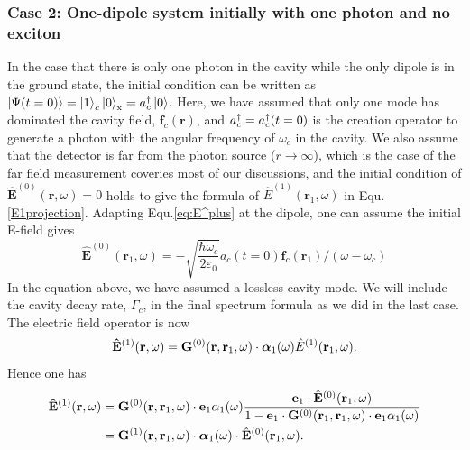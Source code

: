 \subsubsection{Case 2: One-dipole system initially with one photon and no exciton}
In the case that there is only one photon in the cavity while the only dipole is in the ground state, the initial condition can be written as
$\mathinner{|{\Psi(t=0)}\rangle}= \mathinner{|{1}\rangle}_{c} \mathinner{|{0}\rangle}_{\rm x}=a^{\dagger}_c\mathinner{|{0}\rangle}$. Here, we have assumed that only one mode has dominated the cavity field, $\mathbf{f}_c(\mathbf{r})$, and $a^{\dagger}_c=a^{\dagger}_c(t=0)$ is the creation operator to generate a photon with the angular frequency of $\omega_c$ in the cavity. We also assume that the detector is far from the photon source ($r\rightarrow \infty$), which is the case of the far field measurement coveries most of our discussions, and the initial condition of $\mathbf{\hat{E}}^{(0)}(\mathbf{r},\omega)=0$ holds to give the formula of $\hat{E}^{(1)}(\mathbf{r}_1,\omega)$ in Equ.\eqref{E1projection}. Adapting Equ.\eqref{eq:E^plus} at the dipole, one can assume the initial E-field gives
$$\mathbf{\hat{E}}^{(0)}(\mathbf{r}_1,\omega)
 =-\sqrt{\frac{\hbar\omega_c}{2\varepsilon_0}}a_c(t=0)\mathbf{f}_c(\mathbf{r}_1) /(\omega-\omega_c)$$
In the equation above, we have assumed a lossless cavity mode. We will include the cavity decay rate, $\Gamma_c$,
in the final spectrum formula as we did in the last case.
%
The electric field operator is now
\begin{equation}
\mathbf{\hat{E}}^{(1)}({\bf
r},\omega)=\mathbf{G}^{(0)}(\mathbf{r},\mathbf{r}_1,\omega)\cdot
{\bm \alpha}_1(\omega) \hat{E}^{(1)}(\mathbf{r}_1,\omega).
\end{equation}
Hence one has
\begin{align}
\mathbf{\hat{E}}^{(1)}({\bf
r},\omega)&=\mathbf{G}^{(0)}(\mathbf{r},\mathbf{r}_1,\omega)\cdot \mathbf{e}_1
\alpha_1(\omega) \frac{{\bf e}_1 \cdot\hat{{\bf E}}^{(0)}({\bf r}_1,\omega)}
{1-{\bf e}_1 \cdot {\bf G}^{(0)}({\bf r}_1, {\bf r}_1, \omega) \cdot
{\bf e}_1 \alpha_1(\omega)}\\
&=\mathbf{G}^{(1)}(\mathbf{r},\mathbf{r}_1,\omega)\cdot {\bm \alpha}_1(\omega) \cdot \hat{{\bf E}}^{(0)}({\bf r}_1,\omega).
\end{align}

